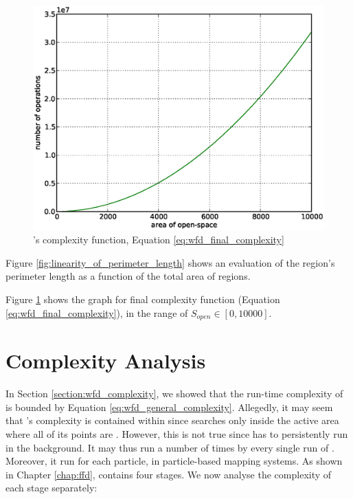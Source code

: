 \begin{figure}
\centering
\includegraphics[width=0.6\columnwidth,keepaspectratio]{images/wfd_comp.eps}
\caption{\WFD's complexity function, Equation \eqref{eq:wfd_final_complexity}
}
\label{fig:wfd_final_complexity}
\end{figure}

Figure \ref{fig:linearity_of_perimeter_length} shows an evaluation of the
\openspace region's perimeter length as a function of the total area of
\openspace regions.

Figure \ref{fig:wfd_final_complexity} shows the graph for \WFD final complexity
function (Equation \eqref{eq:wfd_final_complexity}), in the range
of $S_{open} \in \left[0,10000\right]$.




\section{\FFD Complexity Analysis}
\label{section:ffd_complexity}
In Section \ref{section:wfd_complexity}, we showed that the run-time complexity
of \WFD is bounded by Equation \eqref{eq:wfd_general_complexity}.
Allegedly, it may seem that \FFD's complexity is contained within \WFD since
\FFD searches only inside the active area where all of its points are
\openspace. However, this is not true since \FFD has to persistently run in the
background. It may thus run a number of times by every single run of \WFD.
Moreover, it run for each particle, in particle-based mapping systems.
As shown in Chapter \ref{chap:ffd}, \FFD contains four stages.
We now analyse the complexity of each stage separately: 

